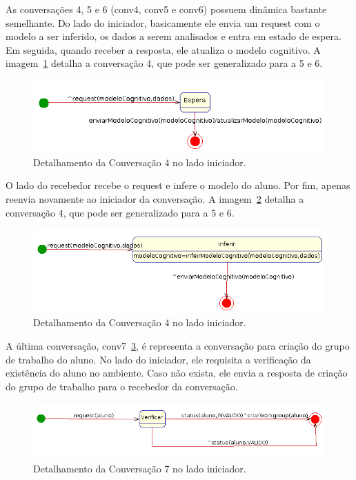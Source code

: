 As conversações 4, 5 e 6 (conv4, conv5 e conv6) possuem dinâmica bastante semelhante. Do lado do iniciador, basicamente ele envia um request com o modelo a ser inferido, os dados a serem analisados e entra em estado de espera. Em seguida, quando receber a resposta, ele atualiza o modelo cognitivo. A imagem~\ref{fig:conv4-iniciador} detalha a conversação 4, que pode ser generalizado para a 5 e 6.
\begin{figure}
	\centering
	\includegraphics[scale=0.48]{images/conv4-iniciador.png}
	\caption{Detalhamento da Conversação 4 no lado iniciador.}
	\label{fig:conv4-iniciador}
\end{figure}

O lado do recebedor recebe o request e infere o modelo do aluno. Por fim, apenas reenvia novamente ao iniciador da conversação.  A imagem~\ref{fig:conv4-recebedor} detalha a conversação 4, que pode ser generalizado para a 5 e 6.
\begin{figure}
	\centering
	\includegraphics[scale=0.48]{images/conv4-recebedor.png}
	\caption{Detalhamento da Conversação 4 no lado iniciador.}
	\label{fig:conv4-recebedor}
\end{figure}

A última conversação, conv7~\ref{fig:conv7-iniciador}, é representa a conversação para criação do grupo de trabalho do aluno. No lado do iniciador, ele requisita a verificação da existência do aluno no ambiente. Caso não exista, ele envia a resposta de criação do grupo de trabalho para o recebedor da conversação.
\begin{figure}
	\centering
	\includegraphics[scale=0.48]{images/conv7-iniciador.png}
	\caption{Detalhamento da Conversação 7 no lado iniciador.}
	\label{fig:conv7-iniciador}
\end{figure}

